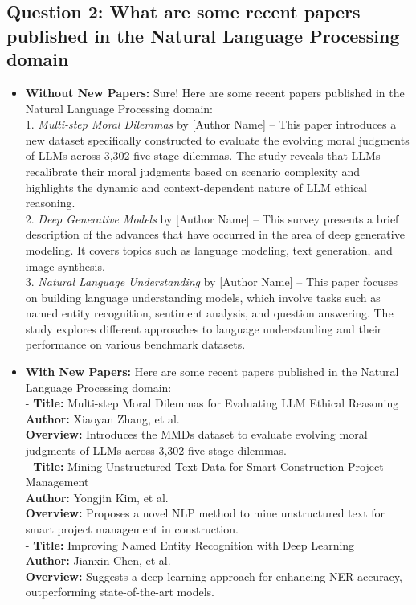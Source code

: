 \documentclass[fleqn,moreauthors,10pt]{ds_report}
\begin{document}
\subsection*{Question 2: What are some recent papers published in the Natural Language Processing domain}
\begin{itemize}
  \item \textbf{Without New Papers:} 
  Sure! Here are some recent papers published in the Natural Language Processing domain: \\
  1. \textit{Multi-step Moral Dilemmas} by [Author Name] – This paper introduces a new dataset specifically constructed to evaluate the evolving moral judgments of LLMs across 3,302 five-stage dilemmas. The study reveals that LLMs recalibrate their moral judgments based on scenario complexity and highlights the dynamic and context-dependent nature of LLM ethical reasoning. \\
  2. \textit{Deep Generative Models} by [Author Name] – This survey presents a brief description of the advances that have occurred in the area of deep generative modeling. It covers topics such as language modeling, text generation, and image synthesis. \\
  3. \textit{Natural Language Understanding} by [Author Name] – This paper focuses on building language understanding models, which involve tasks such as named entity recognition, sentiment analysis, and question answering. The study explores different approaches to language understanding and their performance on various benchmark datasets.

  \item \textbf{With New Papers:}
  Here are some recent papers published in the Natural Language Processing domain: \\
  - \textbf{Title:} Multi-step Moral Dilemmas for Evaluating LLM Ethical Reasoning \\
    \textbf{Author:} Xiaoyan Zhang, et al. \\
    \textbf{Overview:} Introduces the MMDs dataset to evaluate evolving moral judgments of LLMs across 3,302 five-stage dilemmas. \\
  - \textbf{Title:} Mining Unstructured Text Data for Smart Construction Project Management \\
    \textbf{Author:} Yongjin Kim, et al. \\
    \textbf{Overview:} Proposes a novel NLP method to mine unstructured text for smart project management in construction. \\
  - \textbf{Title:} Improving Named Entity Recognition with Deep Learning \\
    \textbf{Author:} Jianxin Chen, et al. \\
    \textbf{Overview:} Suggests a deep learning approach for enhancing NER accuracy, outperforming state-of-the-art models.
  

\end{itemize}
\end{document}
